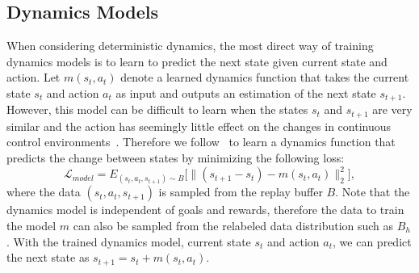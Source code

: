 \documentclass{article}
\newcommand{\genComment}[2]{\ifnum\comments=1{\textcolor{#1}{\textsf{\footnotesize #2}}}\fi}
\newcommand{\moe}[1]{\genComment{blue}{[MF:#1]}}
\begin{document}
\subsection{Dynamics Models}
When considering deterministic dynamics, the most direct way of training dynamics models is to learn to predict the next state given current state and action. Let $m(s_t,a_t)$ denote a learned dynamics function that takes the current state $s_t$ and action $a_t$ as input and outputs an estimation of the next state $s_{t + 1}$. 
However, this model can be difficult to learn when the states $s_t$ and $s_{t+1}$ are very similar and the action has seemingly little
effect on the changes in continuous control environments~\cite{nagabandi2018neural}.
Therefore we follow~\cite{nagabandi2018neural} to learn a dynamics function that predicts the change between states by minimizing the following loss:
\begin{equation}
\label{eq:dynamicloss}
    \mathcal{L}_{model} = E_{(s_t,a_t,s_{t+1})\sim B} \big[\|(s_{t+1} -s_t) - m(s_t,a_t)\|_2^2\big],
\end{equation}
where the data $(s_t,a_t,s_{t+1})$ is sampled from the replay buffer $B$. Note that the dynamics model is independent of goals and rewards, therefore the data to train the model $m$ can also be sampled from the relabeled data distribution such as $B_h$.
With the trained dynamics model, current state $s_t$ and action $a_t$, we can predict the next state as $s_{t+1}=s_t + m(s_t,a_t)$. 



\end{document}
